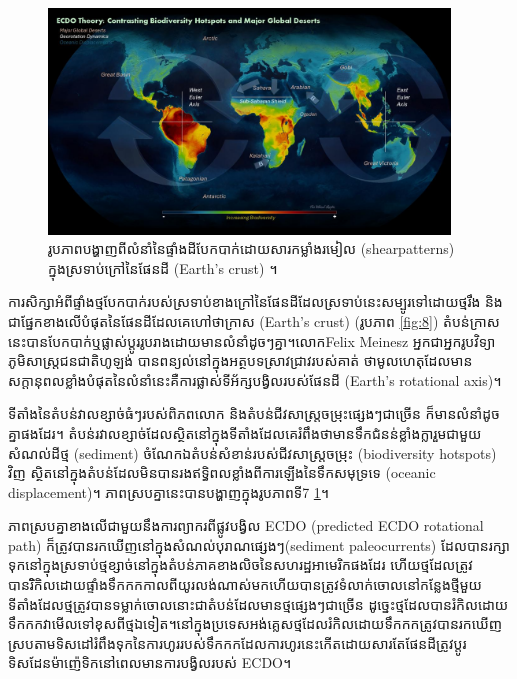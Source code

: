 \documentclass[10pt,twocolumn,letterpaper]{article}
\begin{document}
\begin{figure}[t]
\begin{center}
\includegraphics[width=0.95\textwidth]{biodiversity.jpg}
\end{center}
   \caption{រូបភាពបង្ហាញពីលំនាំនៃផ្ទាំងដីបែកបាក់ដោយសារកម្លាំងរមៀល (shear​patterns) ក្នុងស្រទាប់ក្រៅនៃផែនដី (Earth’s crust) \cite{28}។}
\label{fig:9}
\end{figure}

ការសិក្សាអំពីផ្ទាំងថ្មបែកបាក់របស់ស្រទាប់ខាងក្រៅនៃផែនដី​ដែលស្រទាប់នេះសម្បូរទៅដោយថ្មរឹង និងជាផ្នែកខាងលើបំផុតនៃផែនដីដែលគេហៅថា​ក្រាស (Earth’s crust)​ (រូបភាព \ref{fig:8}) តំបន់ក្រាសនេះបានបែកបាក់ឬផ្លាស់ប្តូររូបរាងដោយមានលំនាំដូចៗគ្នា។លោកFelix Meinesz អ្នកជាអ្នករូបវិទ្យាភូមិសាស្ត្រជនជាតិហូឡង់ បានពន្យល់នៅក្នុងអត្ថបទស្រាវជ្រាវរបស់គាត់\cite{36} ថាមូលហេតុដែលមានសក្ដានុពលខ្លាំងបំផុតនៃលំនាំនេះគឺការផ្លាស់ទីអ័ក្សបង្វិលរបស់ផែនដី (Earth’s rotational axis)។

ទីតាំងនៃតំបន់វាលខ្សាច់ធំៗរបស់ពិភពលោក និងតំបន់ជីវសាស្ត្រចម្រុះផ្សេងៗជាច្រើន ក៏មានលំនាំដូចគ្នាផងដែរ។ តំបន់រវាលខ្សាច់ដែលស្ថិតនៅក្នុងទីតាំងដែលគេរំពឹងថាមានទឹកជំនន់ខ្លាំងក្លារួមជាមួយសំណល់ដីថ្ម (sediment) ចំណែកឯតំបន់សំខាន់របស់ជីវសាស្ត្រចម្រុះ (biodiversity hotspots) វិញ ស្ថិតនៅក្នុងតំបន់ដែលមិនបានរងឥទ្ធិពលខ្លាំងពីការឡើងនៃទឹកសមុទ្រទេ (oceanic displacement)\cite{28}។ ភាពស្របគ្នានេះបានបង្ហាញក្នុងរូបភាពទី7 \ref{fig:9}។

ភាពស្របគ្នាខាងលើជាមួយនឹងការព្យាករពីផ្លូវបង្វិល ECDO (predicted ECDO rotational path) ក៏ត្រូវបានរកឃើញនៅក្នុងសំណល់បុរាណផ្សេងៗ(sediment paleocurrents) ដែលបានរក្សាទុកនៅក្នុងស្រទាប់ថ្មខ្សាច់នៅក្នុងតំបន់ភាគខាងលិចនៃសហរដ្ឋអាមេរិកផងដែរ \cite{21} ហើយថ្មដែលត្រូវបានរំិកិលដោយផ្ទាំងទឹកកកកាលពីយូរលង់ណាស់មកហើយបានត្រូវទំលាក់ចោលនៅកន្លែងថ្មីមួយ​ទីតាំងដែលថ្មត្រូវបានទម្លាក់ចោលនោះជាតំបន់ដែលមានថ្មផ្សេងៗជាច្រើន ដូច្នេះថ្មដែលបានរំកិលដោយទឹកកកវាមើលទៅខុសពីថ្មឯទៀត។នៅក្នុងប្រទេសអង់គ្លេស​ថ្មដែលរំកិលដោយទឹកកកត្រូវបានរកឃើញស្របតាមទិសដៅរំពឹងទុកនៃការហូររបស់ទឹកកក​ដែលការហូរនេះកើតដោយសារតែផែនដីត្រូវប្តូរទិសដែនម៉ាញ៉េទិកនៅពេលមានការបង្វិលរបស់ ECDO\cite{67,68}។
\end{document}
